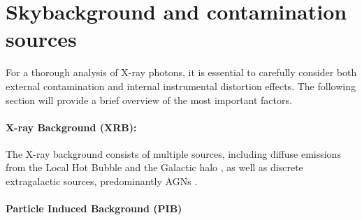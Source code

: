 %
\section{Skybackground and contamination sources}
For a thorough analysis of X-ray photons, it is essential to carefully consider both external contamination and internal instrumental distortion effects. The following section will provide a brief overview of the most important factors.
\paragraph*{X-ray Background (XRB):} The X-ray background consists of multiple sources, including diffuse emissions from the Local Hot Bubble and the Galactic halo \cite{galeazzi2006xmm}, as well as discrete extragalactic sources, predominantly AGNs \cite{brandt2005deep}.
\paragraph*{Particle Induced Background (PIB)} 